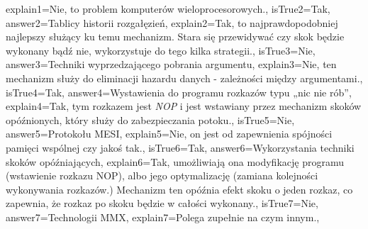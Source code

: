 \begin{enumerate}
\begin{minipage}{\textwidth}
{		explain1={Nie, to problem komputerów wieloprocesorowych.},%
		isTrue2={Tak},%
		answer2={Tablicy historii rozgałęzień},%
		explain2={Tak, to najprawdopodobniej najlepszy służący ku temu mechanizm. Stara się przewidywać czy skok będzie wykonany bądź nie, wykorzystuje do tego kilka strategii.},%
		isTrue3={Nie},%
		answer3={Techniki wyprzedzającego pobrania argumentu},%
		explain3={Nie, ten mechanizm służy do eliminacji hazardu danych - zależności między argumentami.},%
		isTrue4={Tak},%
		answer4={Wystawienia do programu rozkazów typu „nic nie rób”},%
		explain4={Tak, tym rozkazem jest \emph{NOP} i jest wstawiany przez mechanizm skoków opóźnionych, który służy do zabezpieczania potoku.},%
		isTrue5={Nie},%
		answer5={Protokołu MESI}, %
		explain5={Nie, on jest od zapewnienia spójności pamięci wspólnej czy jakoś tak.}, %
		isTrue6={Tak}, %
		answer6={Wykorzystania techniki skoków opóźniających}, %
		explain6={Tak, umożliwiają ona modyfikację programu (wstawienie rozkazu NOP), albo jego optymalizację (zamiana kolejności wykonywania rozkazów.) Mechanizm ten opóźnia efekt skoku o jeden rozkaz, co zapewnia, że rozkaz po skoku będzie w całości wykonany.}, %
		isTrue7={Nie}, %
		answer7={Technologii MMX}, %
		explain7={Polega zupełnie na czym innym.}, %
	}
\end{minipage}
\begin{minipage}{\textwidth}
\end{minipage}
\end{enumerate}
